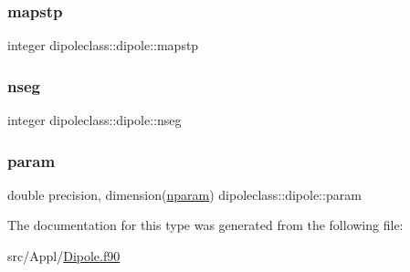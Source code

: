 \mbox{\label{structdipoleclass_1_1dipole_af0a1da636573d6878f6d1c11d0c9e5ab}} 
\subsubsection{\texorpdfstring{mapstp}{mapstp}}
{\footnotesize\ttfamily integer dipoleclass\+::dipole\+::mapstp}

\mbox{\label{structdipoleclass_1_1dipole_a5f280e96dab020ba48b5b28f47b0d5fa}} 
\subsubsection{\texorpdfstring{nseg}{nseg}}
{\footnotesize\ttfamily integer dipoleclass\+::dipole\+::nseg}

\mbox{\label{structdipoleclass_1_1dipole_a5ce0b668334f66ce50e3852ce17ddc39}} 
\subsubsection{\texorpdfstring{param}{param}}
{\footnotesize\ttfamily double precision, dimension(\mbox{\hyperlink{namespacedipoleclass_abc619199e1e9a2811da9e97630125da3}{nparam}}) dipoleclass\+::dipole\+::param}



The documentation for this type was generated from the following file\+:\begin{DoxyCompactItemize}
\item 
src/\+Appl/\mbox{\hyperlink{_dipole_8f90}{Dipole.\+f90}}\end{DoxyCompactItemize}
